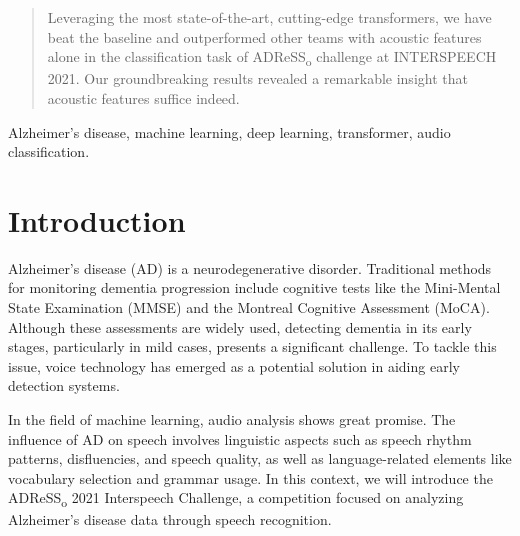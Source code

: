 \documentclass[journal]{IEEEtran}
\begin{document}
\maketitle

\begin{abstract}
Leveraging the most state-of-the-art, cutting-edge transformers, we have beat the baseline and outperformed other teams with acoustic features alone in the classification task of ADReSS\textsubscript{o} challenge at INTERSPEECH 2021. Our groundbreaking results revealed a remarkable insight that acoustic features suffice indeed.
\end{abstract}


\begin{IEEEkeywords}
Alzheimer's disease, machine learning, deep learning, transformer, audio classification.
\end{IEEEkeywords}

%
\IEEEpeerreviewmaketitle

\section{Introduction}
Alzheimer's disease (AD) is a neurodegenerative disorder. Traditional methods for monitoring dementia progression include cognitive tests like the Mini-Mental State Examination (MMSE)\cite{MMSE} and the Montreal Cognitive Assessment (MoCA). Although these assessments are widely used, detecting dementia in its early stages, particularly in mild cases, presents a significant challenge. To tackle this issue, voice technology has emerged as a potential solution in aiding early detection systems.

In the field of machine learning, audio analysis shows great promise. The influence of AD on speech involves linguistic aspects such as speech rhythm patterns, disfluencies, and speech quality, as well as language-related elements like vocabulary selection and grammar usage. In this context, we will introduce the ADReSS\textsubscript{o} 2021 Interspeech Challenge, a competition focused on analyzing Alzheimer's disease data through speech recognition.
\end{document}
